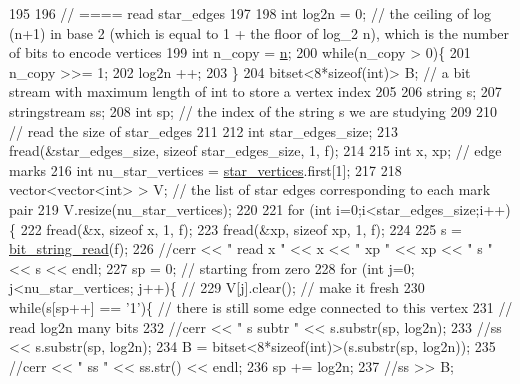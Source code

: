 \begin{DoxyCode}
195 
196   \textcolor{comment}{// ==== read star\_edges}
197 
198   \textcolor{keywordtype}{int} log2n = 0; \textcolor{comment}{// the ceiling of log (n+1) in base 2 (which is equal to 1 + the floor of log\_2 n), which
       is the number of bits to encode vertices}
199   \textcolor{keywordtype}{int} n\_copy = \hyperlink{classmarked__graph__compressed_a8d841016ddb11cfd33748c8deb6277ba}{n};
200   \textcolor{keywordflow}{while}(n\_copy > 0)\{
201     n\_copy >>= 1;
202     log2n ++;
203   \}
204   bitset<8*sizeof(int)> B; \textcolor{comment}{// a bit stream with maximum length of int to store a vertex index}
205 
206   \textcolor{keywordtype}{string} s;
207   stringstream ss;
208   \textcolor{keywordtype}{int} sp; \textcolor{comment}{// the index of the string s we are studying }
209 
210   \textcolor{comment}{// read the size of star\_edges}
211 
212   \textcolor{keywordtype}{int} star\_edges\_size;
213   fread(&star\_edges\_size, \textcolor{keyword}{sizeof} star\_edges\_size, 1, f);
214 
215   \textcolor{keywordtype}{int} x, xp; \textcolor{comment}{// edge marks}
216   \textcolor{keywordtype}{int} nu\_star\_vertices = \hyperlink{classmarked__graph__compressed_a7a4ced4586e2e353f9076bd447df5208}{star\_vertices}.first[1];
217 
218   vector<vector<int> > V; \textcolor{comment}{// the list of star edges corresponding to each mark pair}
219   V.resize(nu\_star\_vertices);
220 
221   \textcolor{keywordflow}{for} (\textcolor{keywordtype}{int} i=0;i<star\_edges\_size;i++)\{
222     fread(&x, \textcolor{keyword}{sizeof} x, 1, f);
223     fread(&xp, \textcolor{keyword}{sizeof} xp, 1, f);
224   
225     s = \hyperlink{compression__helper_8cpp_a40e8dcbc036f96b28e003e882c4890b7}{bit\_string\_read}(f);
226     \textcolor{comment}{//cerr << " read  x " << x << " xp " << xp << " s " << s << endl;}
227     sp = 0; \textcolor{comment}{// starting from zero }
228     \textcolor{keywordflow}{for} (\textcolor{keywordtype}{int} j=0; j<nu\_star\_vertices; j++)\{ \textcolor{comment}{// }
229       V[j].clear(); \textcolor{comment}{// make it fresh}
230       \textcolor{keywordflow}{while}(s[sp++] == \textcolor{charliteral}{'1'})\{ \textcolor{comment}{// there is still some edge connected to this vertex }
231         \textcolor{comment}{// read log2n many bits}
232         \textcolor{comment}{//cerr << " s subtr " << s.substr(sp, log2n);}
233         \textcolor{comment}{//ss << s.substr(sp, log2n);}
234         B = bitset<8*sizeof(int)>(s.substr(sp, log2n));
235         \textcolor{comment}{//cerr << " ss " << ss.str() << endl;}
236         sp += log2n;
237         \textcolor{comment}{//ss >> B;}

\end{DoxyCode}
